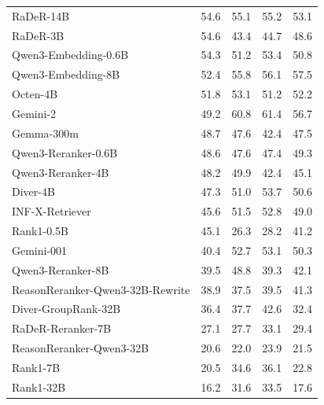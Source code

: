 \begin{tabular}{lrrrr}
RaDeR-14B & 54.6 & 55.1 & 55.2 & 53.1 \\
RaDeR-3B & 54.6 & 43.4 & 44.7 & 48.6 \\
Qwen3-Embedding-0.6B & 54.3 & 51.2 & 53.4 & 50.8 \\
Qwen3-Embedding-8B & 52.4 & 55.8 & 56.1 & 57.5 \\
Octen-4B & 51.8 & 53.1 & 51.2 & 52.2 \\
Gemini-2 & 49.2 & 60.8 & 61.4 & 56.7 \\
Gemma-300m & 48.7 & 47.6 & 42.4 & 47.5 \\
Qwen3-Reranker-0.6B & 48.6 & 47.6 & 47.4 & 49.3 \\
Qwen3-Reranker-4B & 48.2 & 49.9 & 42.4 & 45.1 \\
Diver-4B & 47.3 & 51.0 & 53.7 & 50.6 \\
INF-X-Retriever & 45.6 & 51.5 & 52.8 & 49.0 \\
Rank1-0.5B & 45.1 & 26.3 & 28.2 & 41.2 \\
Gemini-001 & 40.4 & 52.7 & 53.1 & 50.3 \\
Qwen3-Reranker-8B & 39.5 & 48.8 & 39.3 & 42.1 \\
ReasonReranker-Qwen3-32B-Rewrite & 38.9 & 37.5 & 39.5 & 41.3 \\
Diver-GroupRank-32B & 36.4 & 37.7 & 42.6 & 32.4 \\
RaDeR-Reranker-7B & 27.1 & 27.7 & 33.1 & 29.4 \\
ReasonReranker-Qwen3-32B & 20.6 & 22.0 & 23.9 & 21.5 \\
Rank1-7B & 20.5 & 34.6 & 36.1 & 22.8 \\
Rank1-32B & 16.2 & 31.6 & 33.5 & 17.6 \\
\bottomrule
\end{tabular}
